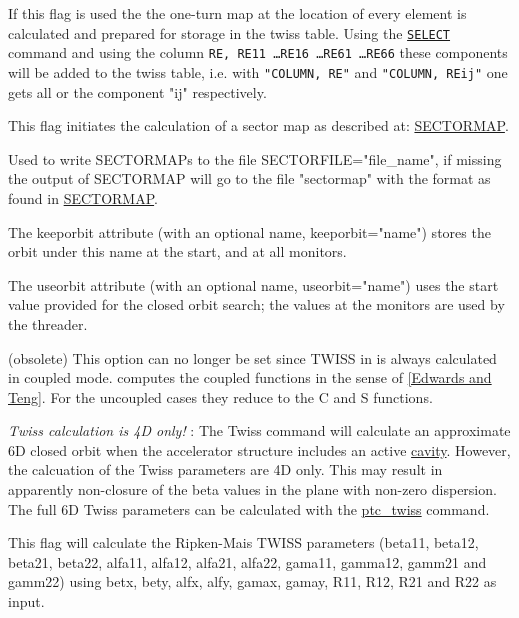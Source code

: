 \begin{madlist}
   If this flag is used the the one-turn map at the
  location of every element is calculated and prepared for
  storage in the twiss table. Using the
  \href{../Introduction/select.html}{\texttt{SELECT}} command and using
  the column \texttt{RE, RE11 \ldots RE16 \ldots RE61 \ldots RE66} these
  components will be added to the twiss table, i.e. with \texttt{"COLUMN, RE"} and
  \texttt{"COLUMN, REij"} one gets all or the component "ij" respectively.    

   This flag initiates the calculation of a sector
  map as described at:
  \href{../Introduction/sectormap.html}{SECTORMAP}.    
  
   Used to write SECTORMAPs to the file
  SECTORFILE="file\_name", if missing the output of SECTORMAP
  will go to the file "sectormap" with the format as found in
  \href{../Introduction/sectormap.html}{SECTORMAP}.    
  
   The keeporbit attribute (with an optional name,
  keeporbit="name") stores the orbit under this name at the
  start, and at all monitors.    

   The useorbit attribute (with an optional name,
  useorbit="name") uses the start value provided for the closed
  orbit search; the values at the monitors are used by the
  threader.    

   (obsolete) This \madeight option can no
  longer be set since TWISS in \madx is always calculated in
  coupled mode. \madx computes the coupled functions in the
  sense of
  \href{../Introduction/bibliography.html#edwards}{[Edwards and
      Teng]}. For the uncoupled cases they reduce to the C and S
  functions.    
  
  \textit{ Twiss calculation is 4D only!} : The Twiss
  command will calculate an approximate 6D closed orbit when the
  accelerator structure includes an active
  \href{../Introduction/cavity.html}{cavity}. However, the
  calcuation of the Twiss parameters are 4D only. This may
  result in apparently non-closure of the beta values in the
  plane with non-zero dispersion. The full 6D Twiss parameters
  can be calculated with the
  \href{../ptc_twiss/ptc_twiss.html}{ptc\_twiss} command.    

   This flag will calculate the Ripken-Mais TWISS
  parameters (beta11, beta12, beta21, beta22, alfa11, alfa12,
  alfa21, alfa22, gama11, gamma12, gamm21 and gamm22) using
  betx, bety, alfx, alfy, gamax, gamay, R11, R12, R21 and R22 as
  input.  

\end{madlist}

